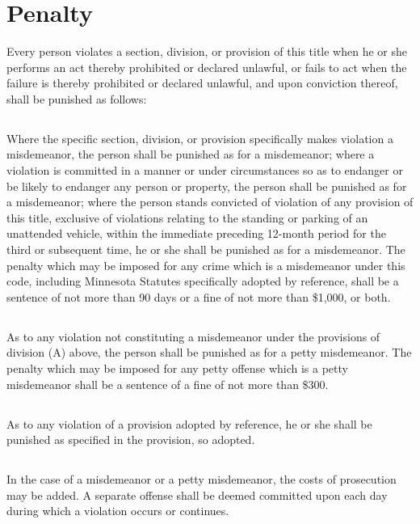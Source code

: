 \setcounter{section}{98}
\section{Penalty}
Every person violates a section, division, or provision of this title when he or she performs an act thereby prohibited or declared unlawful, or fails to act when the failure is thereby prohibited or declared unlawful, and upon conviction thereof, shall be punished as follows:
\subsection{}
Where the specific section, division, or provision specifically makes violation a misdemeanor, the person shall be punished as for a misdemeanor; where a violation is committed in a manner or under circumstances so as to endanger or be likely to endanger any person or property, the person shall be punished as for a misdemeanor; where the person stands convicted of violation of any provision of this title, exclusive of violations relating to the standing or parking of an unattended vehicle, within the immediate preceding 12-month period for the third or subsequent time, he or she shall be punished as for a misdemeanor.  The penalty which may be imposed for any crime which is a misdemeanor under this code, including Minnesota Statutes specifically adopted by reference, shall be a sentence of not more than 90 days or a fine of not more than \$1,000, or both.
\subsection{}
As to any violation not constituting a misdemeanor under the provisions of division (A) above,  the person shall be punished as for a petty misdemeanor.  The penalty which may be imposed for any petty offense which is a petty misdemeanor shall be a sentence of a fine of not more than \$300.
\subsection{}
As to any violation of a provision adopted by reference, he or she shall be punished as specified in the provision, so adopted.
\subsection{}
In the case of a misdemeanor or a petty misdemeanor, the costs of prosecution may be added.  A separate offense shall be deemed committed upon each day during which a violation occurs or continues.
